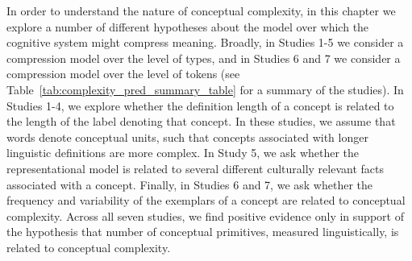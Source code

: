 In order to understand the nature of conceptual complexity, in this chapter we explore a number of different hypotheses about the model over which the cognitive system might compress meaning. Broadly, in Studies 1-5 we consider a compression model over the level of types, and in Studies 6 and 7 we consider a compression model over the level of tokens (see Table~\ref{tab:complexity_pred_summary_table} for a summary of the studies). In Studies 1-4, we explore whether the definition length of a concept  is related to the length of the label denoting that concept. In these studies, we assume that words denote conceptual units, such that concepts associated with longer linguistic definitions are  more complex. In Study 5, we ask whether the representational model is related to several different culturally relevant facts associated with a concept. Finally, in Studies 6 and 7, we ask whether the frequency and variability of the exemplars of a concept are related to conceptual complexity.  Across all seven studies, we find positive evidence only in support of the hypothesis that number of conceptual primitives, measured linguistically, is related to conceptual complexity.





 


